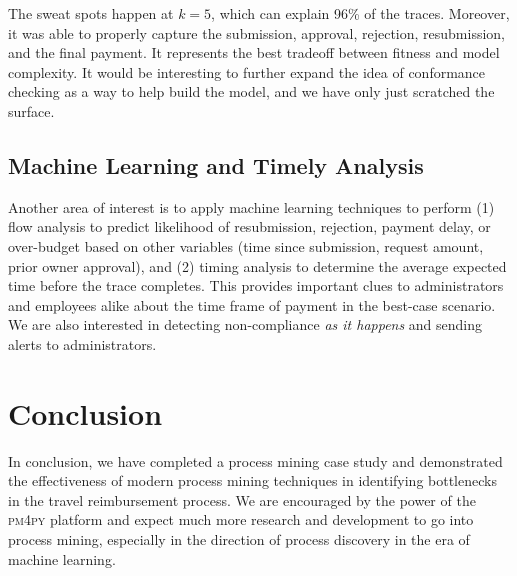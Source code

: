 \documentclass[conference]{IEEEtran}
\begin{document}
The sweat spots happen at $k = 5$, which can explain 96\% of the traces.
Moreover,
it was able to properly capture the submission, approval, rejection,
resubmission, and the final payment. It represents the best tradeoff
between fitness and model complexity. It would be interesting to further
expand the idea of conformance checking as a way to help build the model,
and we have only just scratched the surface.



\subsection{Machine Learning and Timely
Analysis}

Another area of interest is to apply machine learning techniques to
perform (1) flow analysis to predict likelihood of resubmission,
rejection, payment delay, or over-budget based on other variables (time
since submission, request amount, prior owner approval), and (2) timing
analysis to determine the average expected time before the trace completes.
This provides
important clues to administrators and employees alike about the time
frame of payment in the best-case scenario. We are also interested in
detecting non-compliance \textit{as it happens} and sending alerts to
administrators.

\section{Conclusion}
\label{section-conclusion}

In conclusion, we have completed a process mining case study and
demonstrated the effectiveness of modern process mining techniques
in identifying bottlenecks in the travel reimbursement
process. We are encouraged by the power of the \textsc{pm4py} platform
and expect much more research and development to go into process mining,
especially in the direction of process discovery in the era of machine learning.


{}

\end{document}
